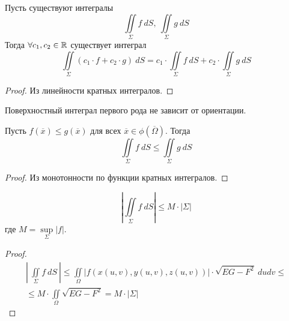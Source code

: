 \begin{statement}
    Пусть существуют интегралы
    \[\iint\limits_{\Sigma}f\ dS,\ \iint\limits_{\Sigma}g\ dS\]
    Тогда $\forall c_1,c_2\in \mathbb{R}$ существует интеграл
    \[\iint\limits_{\Sigma}(c_1\cdot f+c_2\cdot g)\ dS=c_1\cdot \iint\limits_{\Sigma}f\ dS+c_2\cdot \iint\limits_{\Sigma}g\ dS\]
\end{statement}
\begin{proof}
    Из линейности кратных интегралов.
\end{proof}
\begin{statement}
    Поверхностный интеграл первого рода не зависит от ориентации.
\end{statement}
\begin{statement}
    Пусть $f(\overline{x})\leq g(\overline{x})$ для всех $\overline{x}\in \phi(\overline{\Omega})$. Тогда 
    \[\iint\limits_{\Sigma}f\ dS\leq \iint\limits_{\Sigma}g\ dS\]
\end{statement}
\begin{proof}
    Из монотонности по функции кратных интегралов.
\end{proof}
\begin{statement}
    \[\left|\iint\limits_{\Sigma}f\ dS\right|\leq M\cdot |\Sigma|\]
    где $M=\sup\limits_{\Sigma}|f|$.
\end{statement}
\begin{proof}
    \begin{multline*}
        \left|\ \iint\limits_{\Sigma}f\ dS\ \right|\leq \iint\limits_{\Omega}|f(x(u,v),y(u,v),z(u,v))|\cdot\sqrt{EG-F^2}\ dudv \leq\\
        \leq M\cdot \iint\limits_{\Omega}\sqrt{EG-F^2} = M\cdot |\Sigma|
    \end{multline*}
\end{proof}
\newpage